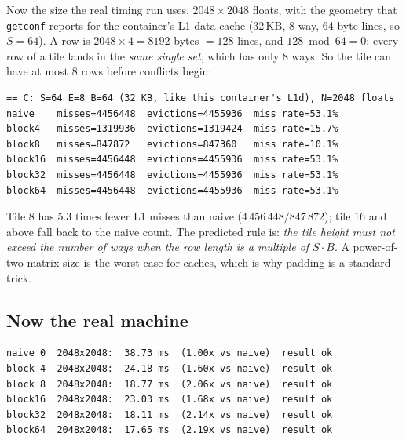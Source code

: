 \begin{example}
Now the size the real timing run uses, \(2048\times2048\) floats, with the
geometry that \texttt{getconf} reports for the container's L1 data cache
(32\,KB, 8-way, 64-byte lines, so \(S=64\)). A row is
\(2048\times4=8192\) bytes \(=128\) lines, and \(128 \bmod 64 = 0\):
every row of a tile lands in the \emph{same single set}, which has only
8 ways. So the tile can have at most 8 rows before conflicts begin:

\begin{lstlisting}[language={},caption={Section C of \texttt{./ch10\_cache\_sim}:
$2048\times2048$ floats on a 32\,KB, 8-way L1.}]
== C: S=64 E=8 B=64 (32 KB, like this container's L1d), N=2048 floats
naive    misses=4456448  evictions=4455936  miss rate=53.1%
block4   misses=1319936  evictions=1319424  miss rate=15.7%
block8   misses=847872   evictions=847360   miss rate=10.1%
block16  misses=4456448  evictions=4455936  miss rate=53.1%
block32  misses=4456448  evictions=4455936  miss rate=53.1%
block64  misses=4456448  evictions=4455936  miss rate=53.1%
\end{lstlisting}

Tile 8 has 5.3 times fewer L1 misses than naive (\(4\,456\,448 / 847\,872\));
tile 16 and above fall back to the naive count. The predicted rule is:
\emph{the tile height must not exceed the number of ways when the row
length is a multiple of \(S\cdot B\)}. A power-of-two matrix size is the
worst case for caches, which is why padding is a standard trick.
\end{example}



\subsection*{Now the real machine}

\begin{lstlisting}[language={},label={lst:real10},caption={\texttt{./ch10\_transpose\_real}
(Linux x86\_64 container, gcc \texttt{-O2}). Each row is the best of 7 full
sweeps of a $2048\times2048$ float transpose, with a checksum to prove the
result is the same transpose. Captured in
\texttt{code/ch10\_transpose\_linux.txt}.}]
naive 0  2048x2048:  38.73 ms  (1.00x vs naive)  result ok
block 4  2048x2048:  24.18 ms  (1.60x vs naive)  result ok
block 8  2048x2048:  18.77 ms  (2.06x vs naive)  result ok
block16  2048x2048:  23.03 ms  (1.68x vs naive)  result ok
block32  2048x2048:  18.11 ms  (2.14x vs naive)  result ok
block64  2048x2048:  17.65 ms  (2.19x vs naive)  result ok
\end{lstlisting}

